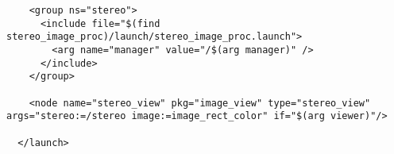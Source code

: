 \begin{center}
\begin{footnotesize}
\begin{verbatim}
    <group ns="stereo">
      <include file="$(find stereo_image_proc)/launch/stereo_image_proc.launch">
        <arg name="manager" value="/$(arg manager)" />
      </include>
    </group>

    <node name="stereo_view" pkg="image_view" type="stereo_view" args="stereo:=/stereo image:=image_rect_color" if="$(arg viewer)"/>

  </launch>

\end{verbatim}
\end{footnotesize}
\end{center}